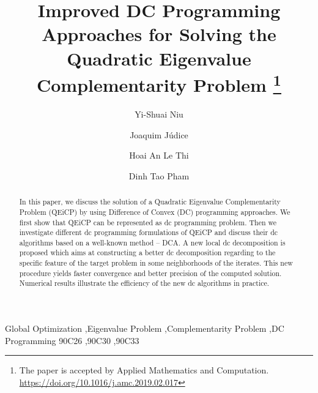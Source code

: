 \documentclass[3p]{elsarticle}
\begin{document}
\begin{frontmatter}

\title{Improved DC Programming Approaches for Solving the Quadratic Eigenvalue Complementarity Problem \footnote{The paper is accepted by Applied Mathematics and Computation. \url{https://doi.org/10.1016/j.amc.2019.02.017}}}%

\author[mainaddress,mainaddressbis]{Yi-Shuai Niu}
\address[mainaddress]{School of Mathematical Sciences, Shanghai Jiao Tong University, Shanghai 200240, China}
\address[mainaddressbis]{SJTU-Paristech Elite Institute of Technology, Shanghai Jiao Tong University, Shanghai 200240, China}

\author[secondaryaddress]{Joaquim J\'udice}
\address[secondaryaddress]{Instituto de Telecomunica\c{c}\~{o}es, Coimbra, Portugal}

\author[thirdaddress]{Hoai An Le Thi}
\address[thirdaddress]{University of Lorraine, Metz, France}

\author[fourthaddress]{Dinh Tao Pham}
\address[fourthaddress]{National Institute of Applied Sciences, Rouen, France}

\begin{abstract}
In this paper, we discuss the solution of a Quadratic Eigenvalue Complementarity Problem (QEiCP) by using Difference of Convex (DC) programming approaches. We first show that QEiCP can be represented as dc programming problem. Then we investigate different dc programming formulations of QEiCP and discuss their dc algorithms based on a well-known method -- DCA. A new local dc decomposition is proposed which aims at constructing a better dc decomposition regarding to the specific feature of the target problem in some neighborhoods of the iterates. This new procedure yields faster convergence and better precision of the computed solution. Numerical results illustrate the efficiency of the new dc algorithms in practice. 
\end{abstract}

\begin{keyword}
Global Optimization \sep Eigenvalue Problem \sep Complementarity Problem \sep DC Programming
\MSC[2010] 90C26 \sep 90C30 \sep 90C33
\end{keyword}

\end{frontmatter}
\end{document}
